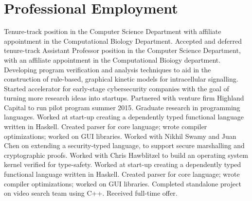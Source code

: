\section{Professional Employment}
  {Tenure-track position in the Computer Science Department with affiliate appointment in the Computational Biology Department.}
  {Accepted and deferred tenure-track Assistant Professor position in the Computer Science Department, with an affiliate appointment in the Computational Bioiogy department.}
  {Developing program verification and analysis techniques to aid in the construction of rule-based, graphical kinetic models for intracellular signalling.}
  {Started accelerator for early-stage cybersecurity companies with the goal of turning more research ideas into startups. Partnered with venture firm Highland Capital to run pilot program summer 2015.}
  {Graduate research in programming languages.}
  {}{Worked at start-up creating a dependently typed functional language written in Haskell.  Created parser for core language; wrote compiler optimizations; worked on GUI libraries.}
  {Worked with Nikhil Swamy and Juan Chen on extending a security-typed language, to support secure marshalling and cryptographic proofs.}
  {Worked with Chris Hawblitzel to build an operating system kernel verified for type-safety.}
  {}{Worked at start-up creating a dependently typed functional language written in Haskell.  Created parser for core language; wrote compiler optimizations; worked on GUI libraries.}
  {Completed standalone project on video search team using C++.  Received full-time offer.}
